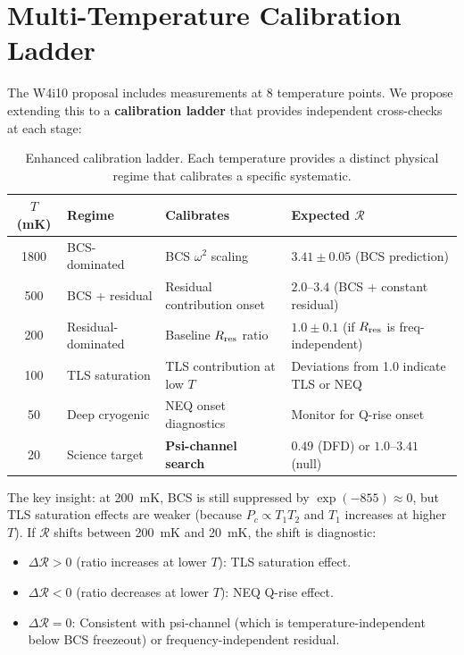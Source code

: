 \documentclass[11pt]{article}
\theoremstyle{definition}
\theoremstyle{remark}
\begin{document}
\section{Multi-Temperature Calibration Ladder}
\label{sec:temp_ladder}

The W4i10 proposal includes measurements at 8 temperature points.
We propose extending this to a \textbf{calibration ladder} that
provides independent cross-checks at each stage:

\begin{table}[H]
\centering
\caption{Enhanced calibration ladder. Each temperature provides a
distinct physical regime that calibrates a specific systematic.}
\label{tab:cal_ladder}
\renewcommand{\arraystretch}{1.3}
\begin{tabular}{@{}cllp{5.5cm}@{}}
\toprule
\textbf{$T$ (mK)} & \textbf{Regime} & \textbf{Calibrates} &
  \textbf{Expected $\mathcal{R}$} \\
\midrule
1800 & BCS-dominated & BCS $\omega^2$ scaling &
  $3.41 \pm 0.05$ (BCS prediction) \\
500 & BCS + residual & Residual contribution onset &
  $2.0$--$3.4$ (BCS + constant residual) \\
200 & Residual-dominated & Baseline $R_{\rm res}$ ratio &
  $1.0 \pm 0.1$ (if $R_{\rm res}$ is freq-independent) \\
100 & TLS saturation & TLS contribution at low $T$ &
  Deviations from 1.0 indicate TLS or NEQ \\
50 & Deep cryogenic & NEQ onset diagnostics &
  Monitor for Q-rise onset \\
\rowcolor{yellow!20}
20 & Science target & \textbf{Psi-channel search} &
  $0.49$ (DFD) or $1.0$--$3.41$ (null) \\
\bottomrule
\end{tabular}
\end{table}

The key insight: at 200~mK, BCS is still suppressed by $\exp(-855) \approx 0$,
but TLS saturation effects are weaker (because $P_c \propto T_1 T_2$ and
$T_1$ increases at higher $T$). If $\mathcal{R}$ shifts between 200~mK
and 20~mK, the shift is diagnostic:
\begin{itemize}[nosep]
\item $\Delta\mathcal{R} > 0$ (ratio increases at lower $T$):
  TLS saturation effect.
\item $\Delta\mathcal{R} < 0$ (ratio decreases at lower $T$):
  NEQ Q-rise effect.
\item $\Delta\mathcal{R} = 0$: Consistent with psi-channel (which is
  temperature-independent below BCS freezeout) or frequency-independent
  residual.
\end{itemize}
\end{document}
